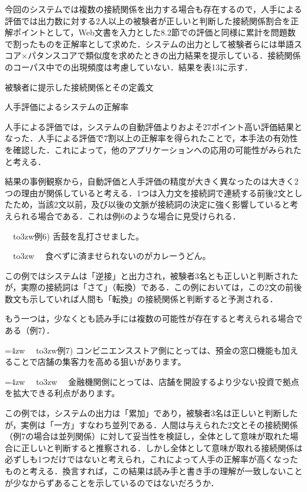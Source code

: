 \documentclass[japanese]{jnlp_1.4}
\begin{document}
今回のシステムでは複数の接続関係を出力する場合も存在するので，人手による評価では出力数に対する2人以上の被験者が正しいと判断した接続関係割合を正解ポイントとして，Web文書を入力とした8.2節での評価と同様に累計を問題数で割ったものを正解率として求めた．システムの出力として被験者らには単語スコア×パタンスコアで類似度を求めたときの出力結果を提示している．接続関係のコーパス中での出現頻度は考慮していない．結果を表13に示す．

\begin{table}[b]
\caption{被験者に提示した接続関係とその定義文}

\end{table}
\begin{table}[b]
\caption{人手評価によるシステムの正解率}

\end{table}

人手による評価では，システムの自動評価よりおよそ27ポイント高い評価結果となった．人手による評価で7割以上の正解率を得られたことで，本手法の有効性を確認した．これによって，他のアプリケーションへの応用の可能性がみられたと考える．

結果の事例観察から，自動評価と人手評価の精度が大きく異なったのは大きく2つの理由が関係していると考える．1つは入力文を接続詞で連続する前後2文としたため，当該2文以前，及び以後の文脈が接続詞の決定に強く影響していると考えられる場合である．これは例6のような場合に見受けられる．

\noindent　\hbox to3zw{例6)\hfill}
舌鼓を乱打させました。

\noindent　\hbox to3zw{　\hfill}
食べずに済ませられないのがカレーうどん。

この例ではシステムは「逆接」と出力され，被験者3名とも正しいと判断されたが，実際の接続詞は「さて」（転換）である．この例においては，この2文の前後数文も示していれば人間も「転換」の接続関係と判断すると予測される．

もう一つは，少なくとも読み手には複数の可能性が存在すると考えられる場合である（例7）．


\hangindent=4zw
\noindent　\hbox to3zw{例7)\hfill}
コンビニエンスストア側にとっては、預金の窓口機能も加えることで店舗の集客力を高める狙いがあります。

\hangindent=4zw
\noindent　\hbox to3zw{　\hfill}
金融機関側にとっては、店舗を開設するより少ない投資で拠点を拡大できる利点があります。

この例では，システムの出力は「累加」であり，被験者3名は正しいと判断したが，実例は「一方」すなわち並列である．人間は与えられた2文とその接続関係（例7の場合は並列関係）に対して妥当性を検証し，全体として意味が取れた場合に正しいと判断すると推察される．しかし全体として意味が取れる接続関係は必ずしも1つだけではないと考えられ，これによって人手の正解率が高くなったものと考える．換言すれば，この結果は読み手と書き手の理解が一致しないことが少なからずあることを示しているのではないだろうか．
\end{document}
